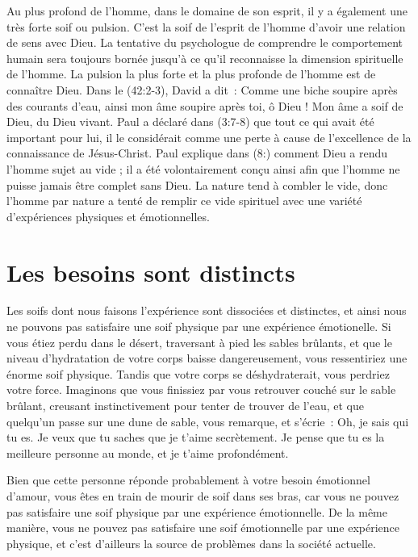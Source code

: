 \pagebreak

Au plus profond de l'homme, dans le domaine de son esprit,
 il y a également une très forte soif ou pulsion.
 C'est la soif de l'esprit de l'homme d'avoir une relation de sens avec Dieu.
 La tentative du psychologue de comprendre le comportement humain sera toujours
 bornée jusqu'à ce qu'il reconnaisse la dimension spirituelle de l'homme.
 La pulsion la plus forte et la plus profonde de l'homme est de connaître Dieu.
 Dans le (42:2-3), David a dit~:
 \og Comme une biche soupire après des courants d'eau,
 ainsi mon âme soupire après toi, ô Dieu !
 Mon âme a soif de Dieu, du Dieu vivant. \fg{}
 Paul a déclaré dans (3:7-8) que tout ce qui avait été
 important pour lui, il le considérait comme une perte à cause
 de l'excellence de la connaissance de Jésus-Christ.
 Paul explique dans (8:) comment Dieu a rendu l'homme
 sujet au vide ; il a été volontairement conçu ainsi afin que l'homme
 ne puisse jamais être complet sans Dieu.
 La nature tend à combler le vide, donc l'homme par nature a tenté
 de remplir ce vide spirituel avec une variété d'expériences physiques
 et émotionnelles.


\section{Les besoins sont distincts}


Les soifs dont nous faisons l'expérience sont dissociées et distinctes,
 et ainsi nous ne pouvons pas satisfaire une soif physique
 par une expérience émotionelle. Si vous étiez perdu dans le désert,
 traversant à pied les sables brûlants, et que le niveau d'hydratation
 de votre corps baisse dangereusement, vous ressentiriez une énorme soif
 physique. Tandis que votre corps se déshydraterait,
 vous perdriez votre force. Imaginons que vous finissiez par vous
 retrouver couché sur le sable brûlant, creusant instinctivement
 pour tenter de trouver de l'eau, et que quelqu'un passe sur une dune
 de sable, vous remarque, et s'écrie~:
 \og Oh, je sais qui tu es. Je veux que tu saches que je t'aime secrètement.
 Je pense que tu es la meilleure personne au monde,
 et je t'aime profondément. \fg{}

\pagebreak 

Bien que cette personne réponde probablement à votre besoin émotionnel
 d'amour, vous êtes en train de mourir de soif dans ses bras,
 car vous ne pouvez pas satisfaire une soif physique par une \linebreak
 expérience émotionnelle. De la même manière, vous ne pouvez pas satisfaire une soif
 émotionnelle par une expérience physique,
 et c'est d'ailleurs la source de problèmes dans la société actuelle.



